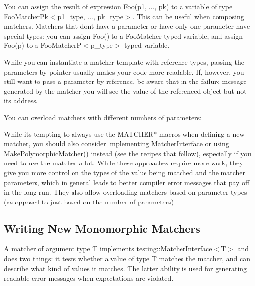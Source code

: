 You can assign the result of expression {\ttfamily Foo(p1, ..., pk)} to a variable of type {\ttfamily Foo\+Matcher\+Pk$<$p1\+\_\+type, ..., pk\+\_\+type$>$}. This can be useful when composing matchers. Matchers that don\textquotesingle{}t have a parameter or have only one parameter have special types\+: you can assign {\ttfamily Foo()} to a {\ttfamily Foo\+Matcher}-\/typed variable, and assign {\ttfamily Foo(p)} to a {\ttfamily Foo\+MatcherP$<$p\+\_\+type$>$}-\/typed variable.

While you can instantiate a matcher template with reference types, passing the parameters by pointer usually makes your code more readable. If, however, you still want to pass a parameter by reference, be aware that in the failure message generated by the matcher you will see the value of the referenced object but not its address.

You can overload matchers with different numbers of parameters\+: 
\begin{DoxyCode}{0}
\end{DoxyCode}


While it\textquotesingle{}s tempting to always use the {\ttfamily M\+A\+T\+C\+H\+E\+R$\ast$} macros when defining a new matcher, you should also consider implementing {\ttfamily Matcher\+Interface} or using {\ttfamily Make\+Polymorphic\+Matcher()} instead (see the recipes that follow), especially if you need to use the matcher a lot. While these approaches require more work, they give you more control on the types of the value being matched and the matcher parameters, which in general leads to better compiler error messages that pay off in the long run. They also allow overloading matchers based on parameter types (as opposed to just based on the number of parameters).

\subsection*{Writing New Monomorphic Matchers}

A matcher of argument type {\ttfamily T} implements {\ttfamily \mbox{\hyperlink{classtesting_1_1_matcher_interface}{testing\+::\+Matcher\+Interface}}$<$T$>$} and does two things\+: it tests whether a value of type {\ttfamily T} matches the matcher, and can describe what kind of values it matches. The latter ability is used for generating readable error messages when expectations are violated.

